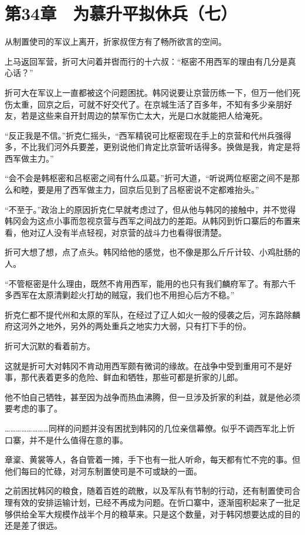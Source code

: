 \section{第34章　为慕升平拟休兵（七）}

从制置使司的军议上离开，折家叔侄方有了畅所欲言的空间。

上马返回军营，折可大问着并辔而行的十六叔：“枢密不用西军的理由有几分是真心话？”

折可大在军议上一直都被这个问题困扰。韩冈说要让京营历练一下，但万一他们死伤太重，回京之后，可就不好交代了。在京城生活了百多年，不知有多少亲朋好友，若是这些来自开封周边的禁军伤亡太大，光是口水就能把人给淹死。

“反正我是不信。”折克仁摇头，“西军精锐可比枢密现在手上的京营和代州兵强得多，不比我们河外兵要差，更别说他们肯定比京营听话得多。换做是我，肯定是将西军做主力。”

“会不会是韩枢密和吕枢密之间有什么瓜葛。”折可大道，“听说两位枢密之间不是那么和睦，要是用了西军做主力，回京后见到了吕枢密说不定都难抬头。”

“不至于。”政治上的原因折克仁早就考虑过了，但从他与韩冈的接触中，并不觉得韩冈会为这点小事而忽视京营与西军之间战力的差距。从韩冈到忻口寨后的布置来看，他对辽人没有半点轻视，对京营的战斗力也看得很清楚。

折可大想了想，点了点头。韩冈给他的感觉，也不像是那么斤斤计较、小鸡肚肠的人。

“不管枢密是什么理由，既然不肯用西军，能用的也只有我们麟府军了。有那六千多西军在太原清剿趁火打劫的贼寇，我们也不用担心后方不稳。”

折克仁都不提代州和太原的军队，在经过了辽人如火一般的侵袭之后，河东路除麟府这河外之地外，另外的两处重兵之地实力大弱，只有打下手的份。

折可大沉默的看着前方。

这就是折可大对韩冈不肯动用西军颇有微词的缘故。在战争中受到重用可不是好事，那代表着更多的危险、鲜血和牺牲，那些可都是折家的儿郎。

他不怕自己牺牲，甚至因为战争而热血沸腾，但一旦涉及折家的利益，就是他必须要考虑的事了。

……………………同样的问题并没有困扰到韩冈的几位亲信幕僚。似乎不调西军北上忻口寨，并不是什么值得在意的事。

章楶、黄裳等人，各自管着一摊，手下也有一批人听命，每天都有忙不完的事。但他们每曰的忙碌，对河东制置使司是不可或缺的一面。

之前困扰韩冈的粮食，随着百姓的疏散，以及军队有节制的行动，还有制置使司合理有效的安排运输计划，已经不再成为问题。在忻口寨中，逐渐囤积起来了一批足够供给全军大规模作战半个月的粮草来。只是这个数量，对于韩冈想要达成的目的还是差了很远。

